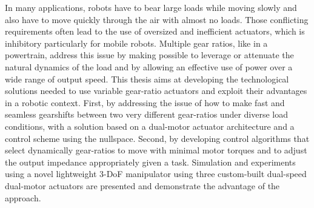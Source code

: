 In many applications, robots have to bear large loads while moving slowly and also have to move quickly through the air with almost no loads. Those conflicting requirements often lead to the use of oversized and inefficient actuators, which is inhibitory particularly for mobile robots. Multiple gear ratios, like in a powertrain, address this issue by making possible to leverage or attenuate the natural dynamics of the load and by allowing an effective use of power over a wide range of output speed. This thesis aims at developing the technological solutions needed to use variable gear-ratio actuators and exploit their advantages in a robotic context. First, by addressing the issue of how to make fast and seamless gearshifts between two very different gear-ratios under diverse load conditions, with a solution based on a dual-motor actuator architecture and a control scheme using the nullspace. Second, by developing control algorithms that select dynamically gear-ratios to move with minimal motor torques and to adjust the output impedance appropriately given a task. Simulation and experiments using a novel lightweight 3-DoF manipulator using three custom-built dual-speed dual-motor actuators are presented and demonstrate the advantage of the approach. 


